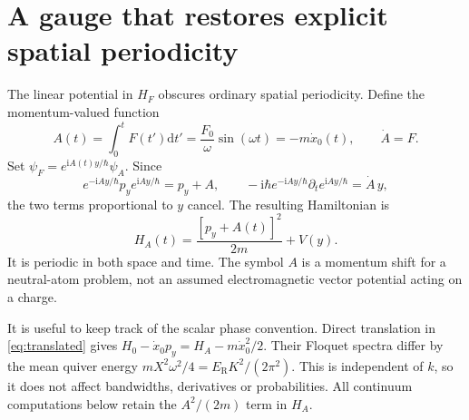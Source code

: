 \documentclass[11pt,oneside]{report}
\numberwithin{equation}{chapter}
\newcommand{\ER}{E_{\mathrm R}}
\newcommand{\ii}{\mathrm i}
\newcommand{\dd}{\mathrm d}
\begin{document}
\section{A gauge that restores explicit spatial periodicity}
The linear potential in $H_F$ obscures ordinary spatial periodicity. Define the momentum-valued function
\begin{equation}
 A(t)=\int_0^t F(t')\dd t'=\frac{F_0}{\omega}\sin(\omega t)=-m\dot x_0(t),\qquad \dot A=F.
\end{equation}
Set $\psi_F=e^{\ii A(t)y/\hbar}\psi_A$. Since
\begin{equation}
 e^{-\ii Ay/\hbar}p_y e^{\ii Ay/\hbar}=p_y+A,\qquad
 -\ii\hbar e^{-\ii Ay/\hbar}\partial_t e^{\ii Ay/\hbar}=\dot A\,y,
\end{equation}
the two terms proportional to $y$ cancel. The resulting Hamiltonian is
\begin{equation}\label{eq:vectorH}
 H_A(t)=\frac{[p_y+A(t)]^2}{2m}+V(y).
\end{equation}
It is periodic in both space and time. The symbol $A$ is a momentum shift for a neutral-atom problem, not an assumed electromagnetic vector potential acting on a charge.

It is useful to keep track of the scalar phase convention. Direct translation in \cref{eq:translated} gives $H_0-\dot x_0p_y=H_A-m\dot x_0^2/2$. Their Floquet spectra differ by the mean quiver energy $mX^2\omega^2/4=\ER K^2/(2\pi^2)$. This is independent of $k$, so it does not affect bandwidths, derivatives or probabilities. All continuum computations below retain the $A^2/(2m)$ term in $H_A$.
\end{document}
